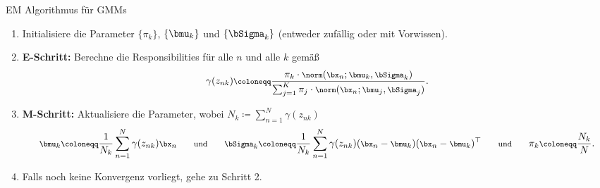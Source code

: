 \begin{frame}{EM Algorithmus für GMMs}{}
	\begin{myalg}
		\begin{enumerate}
			\item Initialisiere die Parameter $\{ \pi_k \}$, $\{ \bmu_k \}$ und $\{ \bSigma_k \}$ (entweder zufällig oder mit Vorwissen). 
			\item \textbf{E-Schritt:} Berechne die Responsibilities für alle $n$ und alle $k$ gemäß
			\begin{equation*}
			\footnotesize
				\gamma(z_{nk})
					\coloneqq \frac{\pi_k \cdot \norm(\bx_n; \bmu_k, \bSigma_k)}{\sum_{j=1}^K \pi_j \cdot \norm(\bx_n; \bmu_j, \bSigma_j)}.
			\end{equation*}
			\item \textbf{M-Schritt:} Aktualisiere die Parameter, wobei $N_k \coloneqq \sum_{n=1}^N \gamma(z_{nk})$
			\begin{equation*}
			\footnotesize
				\bmu_k \coloneqq \frac{1}{N_k} \sum_{n=1}^N \gamma(z_{nk}) \bx_n
			\qquad\text{und}\qquad
				\bSigma_k \coloneqq \frac{1}{N_k} \sum_{n=1}^N \gamma(z_{nk}) (\bx_n - \bmu_k) (\bx_n - \bmu_k)^\top
			\qquad\text{und}\qquad 
				\pi_k \coloneqq \frac{N_k}{N}.
			\end{equation*}
			\item Falls noch keine Konvergenz vorliegt, gehe zu Schritt 2.
		\end{enumerate}
	\end{myalg}
\end{frame}